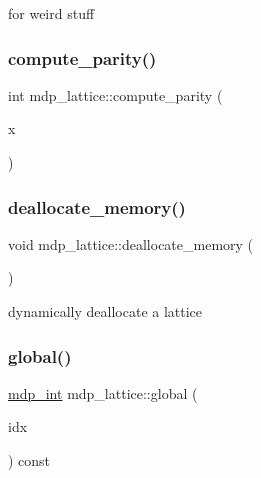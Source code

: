for weird stuff 

\mbox{\label{classmdp__lattice_a3c949964a192c244a6f39df0aaceb1d2}} 
\subsubsection{\texorpdfstring{compute\+\_\+parity()}{compute\_parity()}}
{\footnotesize\ttfamily int mdp\+\_\+lattice\+::compute\+\_\+parity (\begin{DoxyParamCaption}\item[{int $\ast$}]{x }\end{DoxyParamCaption})\hspace{0.3cm}{\ttfamily [inline]}}

\mbox{\label{classmdp__lattice_af5407cf7f7d5eded3870abf0515e110d}} 
\subsubsection{\texorpdfstring{deallocate\+\_\+memory()}{deallocate\_memory()}}
{\footnotesize\ttfamily void mdp\+\_\+lattice\+::deallocate\+\_\+memory (\begin{DoxyParamCaption}{ }\end{DoxyParamCaption})\hspace{0.3cm}{\ttfamily [inline]}}



dynamically deallocate a lattice 

\mbox{\label{classmdp__lattice_a23407af46f9715886fd574f06cd4a05e}} 
\subsubsection{\texorpdfstring{global()}{global()}}
{\footnotesize\ttfamily \hyperlink{mdp__global__vars_8h_aaa1ad9d0dcd2124aa5af0120d9954174}{mdp\+\_\+int} mdp\+\_\+lattice\+::global (\begin{DoxyParamCaption}\item[{\hyperlink{mdp__global__vars_8h_aaa1ad9d0dcd2124aa5af0120d9954174}{mdp\+\_\+int}}]{idx }\end{DoxyParamCaption}) const\hspace{0.3cm}{\ttfamily [inline]}}

